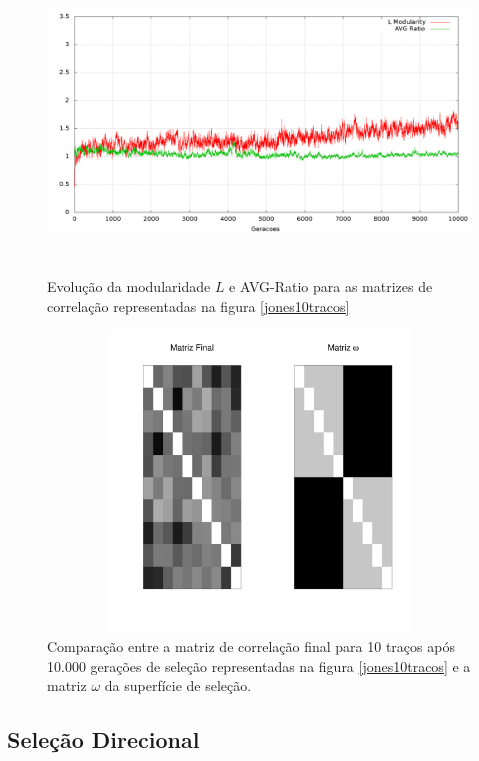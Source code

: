 \begin{figure}[htbp]
  \centering
  \includegraphics[width=150mm, height=80mm]{figuras/jones10tracosStats.png}
  \caption{Evolução da modularidade $L$ e AVG-Ratio para as matrizes de
  correlação representadas na figura \ref{jones10tracos}}
  \label{jones10tracosStats}
\end{figure}



\begin{figure}[htbp]
  \centering
  \includegraphics[width=150mm, height=80mm]{figuras/Mat10tracos}
  \caption{Comparação entre a matriz de correlação final para 10
  traços após 10.000 gerações de seleção representadas na figura
  \ref{jones10tracos} e a matriz $\omega$ da superfície de seleção.}
  \label{MatJones10tracos}
\end{figure}



\subsection{Seleção Direcional}


